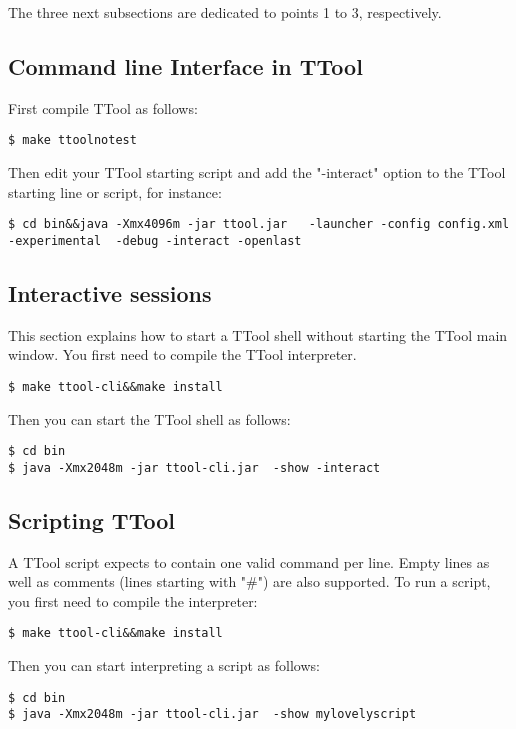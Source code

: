 \documentclass[12pt]{article}
\begin{document}
The three next subsections are dedicated to points 1 to 3, respectively.

\subsection{Command line Interface in TTool}

First compile TTool as follows:

\begin{lstlisting}
$ make ttoolnotest
\end{lstlisting}
Then edit your TTool starting script and add the "-interact" option to the TTool starting line or script, for instance:
\begin{lstlisting}
$ cd bin&&java -Xmx4096m -jar ttool.jar   -launcher -config config.xml
-experimental  -debug -interact -openlast
\end{lstlisting}


\subsection{Interactive sessions}
This section explains how to start a TTool shell without starting the TTool main window. You first need to compile the TTool interpreter.

\begin{lstlisting}
$ make ttool-cli&&make install
\end{lstlisting}
Then you can start the TTool shell  as follows:
\begin{lstlisting}
$ cd bin
$ java -Xmx2048m -jar ttool-cli.jar  -show -interact
\end{lstlisting}

\subsection{Scripting TTool}
A TTool script expects to contain one valid command per line. Empty lines as well as comments (lines starting with "\#") are also supported. To run a script, you first need to compile the interpreter:

\begin{lstlisting}
$ make ttool-cli&&make install
\end{lstlisting}
Then you can start interpreting a script as follows:
\begin{lstlisting}
$ cd bin
$ java -Xmx2048m -jar ttool-cli.jar  -show mylovelyscript
\end{lstlisting}
\end{document}
